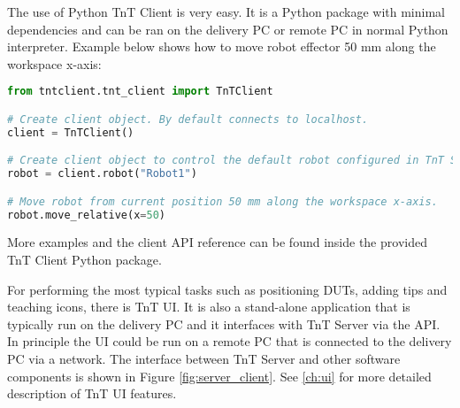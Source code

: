 The use of Python TnT Client is very easy. It is a Python package with minimal dependencies and can be ran on the delivery PC or remote PC in normal Python interpreter. Example below shows how to move robot effector 50 mm along the workspace  x-axis:

\begin{lstlisting}[language=Python]
from tntclient.tnt_client import TnTClient

# Create client object. By default connects to localhost.
client = TnTClient()

# Create client object to control the default robot configured in TnT Server.
robot = client.robot("Robot1")

# Move robot from current position 50 mm along the workspace x-axis.
robot.move_relative(x=50)
\end{lstlisting}

More examples and the client API reference can be found inside the provided TnT Client Python package.

For performing the most typical tasks such as positioning DUTs, adding tips and teaching icons, there is TnT UI. It is also a stand-alone application that is typically run on the delivery PC and it interfaces with TnT Server via the API. In principle the UI could be run on a remote PC that is connected to the delivery PC via a network. The interface between TnT Server and other software components is shown in Figure \ref{fig:server_client}. See \autoref{ch:ui} for more detailed description of TnT UI features.
